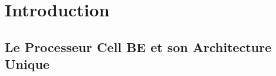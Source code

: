 \documentclass[11pt]{report}
\begin{document}
\section{Introduction}
\subsection{Le Processeur Cell BE et son Architecture Unique}

\end{document}
